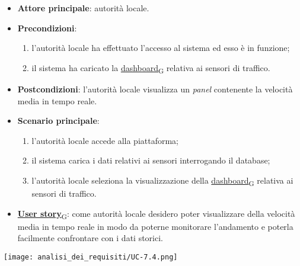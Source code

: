 \begin{itemize}
	\item \textbf{Attore principale}: autorità locale.
	\item \textbf{Precondizioni}:
	      \begin{enumerate}
		      \item l'autorità locale ha effettuato l'accesso al sistema ed esso è in funzione;
		      \item il sistema ha caricato la \href{https://7last.github.io/docs/rtb/documentazione-interna/glossario\#dashboard}{dashboard\textsubscript{G}} relativa ai sensori di traffico.
	      \end{enumerate}
	\item \textbf{Postcondizioni}: l'autorità locale visualizza un \textit{panel} contenente la velocità media in tempo reale.
	\item \textbf{Scenario principale}:
	      \begin{enumerate}
		      \item l'autorità locale accede alla piattaforma;
		      \item il sistema carica i dati relativi ai sensori interrogando il database;
		      \item l'autorità locale seleziona la visualizzazione della \href{https://7last.github.io/docs/rtb/documentazione-interna/glossario\#dashboard}{dashboard\textsubscript{G}} relativa ai sensori di traffico.
	      \end{enumerate}
	\item \href{https://7last.github.io/docs/rtb/documentazione-interna/glossario\#user-story}{\textbf{User story}\textsubscript{G}}:
	      come autorità locale desidero poter visualizzare della velocità media in tempo reale in modo da poterne monitorare l'andamento
	      e poterla facilmente confrontare con i dati storici.
\end{itemize}
\begin{center}
	\texttt{[image: analisi\_dei\_requisiti/UC-7.4.png]}
\end{center}

\newpage


